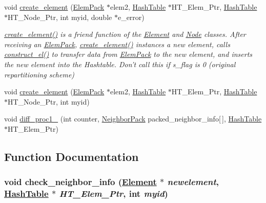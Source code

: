 \begin{CompactItemize}
\item 
void \hyperlink{update__element__info_8C_a5}{create\_\-element} (\hyperlink{structElemPack}{Elem\-Pack} $\ast$elem2, \hyperlink{classHashTable}{Hash\-Table} $\ast$HT\_\-Elem\_\-Ptr, \hyperlink{classHashTable}{Hash\-Table} $\ast$HT\_\-Node\_\-Ptr, int myid, double $\ast$e\_\-error)
\begin{CompactList}\small\item\em \hyperlink{BSFC__update__and__send__elements_8C_a0}{create\_\-element()} is a friend function of the \hyperlink{classElement}{Element} and \hyperlink{classNode}{Node} classes. After receiving an \hyperlink{structElemPack}{Elem\-Pack}, \hyperlink{BSFC__update__and__send__elements_8C_a0}{create\_\-element()} instances a new element, calls \hyperlink{update__element__info_8C_a2}{construct\_\-el()} to transfer data from \hyperlink{structElemPack}{Elem\-Pack} to the new element, and inserts the new element into the Hashtable. Don't call this if s\_\-flag is 0 (original repartitioning scheme) \item\end{CompactList}\item 
void \hyperlink{update__element__info_8C_a6}{create\_\-element} (\hyperlink{structElemPack}{Elem\-Pack} $\ast$elem2, \hyperlink{classHashTable}{Hash\-Table} $\ast$HT\_\-Elem\_\-Ptr, \hyperlink{classHashTable}{Hash\-Table} $\ast$HT\_\-Node\_\-Ptr, int myid)
\item 
void \hyperlink{update__element__info_8C_a7}{diff\_\-proc1\_} (int counter, \hyperlink{structNeighborPack}{Neighbor\-Pack} packed\_\-neighbor\_\-info\mbox{[}$\,$\mbox{]}, \hyperlink{classHashTable}{Hash\-Table} $\ast$HT\_\-Elem\_\-Ptr)
\end{CompactItemize}


\subsection{Function Documentation}
\hypertarget{update__element__info_8C_a3}{
\subsubsection[check\_\-neighbor\_\-info]{\setlength{\rightskip}{0pt plus 5cm}void check\_\-neighbor\_\-info (\hyperlink{classElement}{Element} $\ast$ {\em newelement}, \hyperlink{classHashTable}{Hash\-Table} $\ast$ {\em HT\_\-Elem\_\-Ptr}, int {\em myid})}}
\label{update__element__info_8C_a3}


